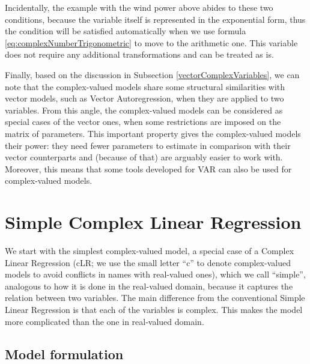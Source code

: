 \documentclass[
]{book}
\begin{document}
Incidentally, the example with the wind power above abides to these two conditions, because the variable itself is represented in the exponential form, thus the condition will be satisfied automatically when we use formula \eqref{eq:complexNumberTrigonometric} to move to the arithmetic one. This variable does not require any additional transformations and can be treated as is.

Finally, based on the discussion in Subsection \ref{vectorComplexVariables}, we can note that the complex-valued models share some structural similarities with vector models, such as Vector Autoregression, when they are applied to two variables. From this angle, the complex-valued models can be considered as special cases of the vector ones, when some restrictions are imposed on the matrix of parameters. This important property gives the complex-valued models their power: they need fewer parameters to estimate in comparison with their vector counterparts and (because of that) are arguably easier to work with. Moreover, this means that some tools developed for VAR can also be used for complex-valued models.

\hypertarget{simpleCLR}{%
\chapter{Simple Complex Linear Regression}\label{simpleCLR}}

We start with the simplest complex-valued model, a special case of a Complex Linear Regression (cLR; we use the small letter ``c'' to denote complex-valued models to avoid conflicts in names with real-valued ones), which we call ``simple'', analogous to how it is done in the real-valued domain, because it captures the relation between two variables. The main difference from the conventional Simple Linear Regression is that each of the variables is complex. This makes the model more complicated than the one in real-valued domain.

\hypertarget{simpleCLRModel}{%
\section{Model formulation}\label{simpleCLRModel}}
\end{document}
